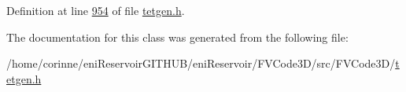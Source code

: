 Definition at line \hyperlink{tetgen_8h_source_l00954}{954} of file \hyperlink{tetgen_8h_source}{tetgen.\+h}.



The documentation for this class was generated from the following file\+:\begin{DoxyCompactItemize}
\item 
/home/corinne/eni\+Reservoir\+G\+I\+T\+H\+U\+B/eni\+Reservoir/\+F\+V\+Code3\+D/src/\+F\+V\+Code3\+D/\hyperlink{tetgen_8h}{tetgen.\+h}\end{DoxyCompactItemize}
